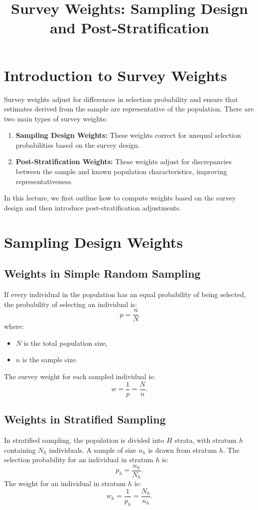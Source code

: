 \documentclass[12pt]{article}
\title{Survey Weights: Sampling Design and Post-Stratification}
\author{}
\date{}
\begin{document}
\maketitle

\section{Introduction to Survey Weights}

Survey weights adjust for differences in selection probability and ensure that estimates derived from the sample are representative of the population. There are two main types of survey weights:

\begin{enumerate}
    \item \textbf{Sampling Design Weights:} These weights correct for unequal selection probabilities based on the survey design.
    \item \textbf{Post-Stratification Weights:} These weights adjust for discrepancies between the sample and known population characteristics, improving representativeness.
\end{enumerate}

In this lecture, we first outline how to compute weights based on the survey design and then introduce post-stratification adjustments.

\section{Sampling Design Weights}

\subsection{Weights in Simple Random Sampling}
If every individual in the population has an equal probability of being selected, the probability of selecting an individual is:
\[
p = \frac{n}{N}
\]
where:
\begin{itemize}
    \item \( N \) is the total population size,
    \item \( n \) is the sample size.
\end{itemize}
The survey weight for each sampled individual is:
\[
w = \frac{1}{p} = \frac{N}{n}.
\]

\subsection{Weights in Stratified Sampling}
In stratified sampling, the population is divided into \( H \) strata, with stratum \( h \) containing \( N_h \) individuals. A sample of size \( n_h \) is drawn from stratum \( h \). The selection probability for an individual in stratum \( h \) is:
\[
p_h = \frac{n_h}{N_h}.
\]
The weight for an individual in stratum \( h \) is:
\[
w_h = \frac{1}{p_h} = \frac{N_h}{n_h}.
\]
\end{document}
